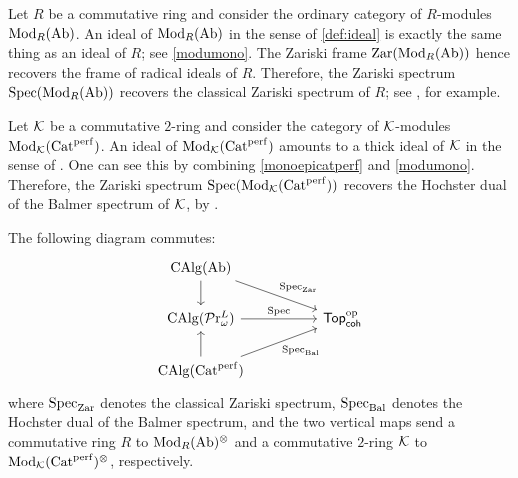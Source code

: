\documentclass[10pt,a4paper,oneside]{article}
\begin{document}
\begin{ex}\label{ex:Zariski}
Let $R$ be a commutative ring and consider the ordinary category of $R$-modules $\operatorname{Mod}_{R}(\operatorname{Ab})$. An ideal of $\operatorname{Mod}_{R}(\operatorname{Ab})$ in the sense of \cref{def:ideal} is exactly the same thing as an ideal of $R$; see \cref{modumono}. The Zariski frame $\operatorname{Zar}(\operatorname{Mod}_{R}(\operatorname{Ab}))$ hence recovers the frame of radical ideals of $R$. Therefore, the Zariski spectrum $\operatorname{Spec}(\operatorname{Mod}_{R}(\operatorname{Ab}))$ recovers the classical Zariski spectrum of $R$; see \cite[Lemma~1.3.1]{KockPitsch17}, for example.
\end{ex}

\begin{ex}\label{ex:Balmer}
Let $\mathcal{K}$ be a commutative $2$-ring and consider the category of $\mathcal K$-modules $\operatorname{Mod}_{\mathcal K}(\operatorname{Cat}^{\operatorname{perf}})$. An ideal of $\operatorname{Mod}_{\mathcal K}(\operatorname{Cat}^{\operatorname{perf}})$ amounts to a thick ideal of $\mathcal K$ in the sense of \cite{Balmer05a}. One can see this by combining \cref{monoepicatperf} and \cref{modumono}. Therefore, the Zariski spectrum $\operatorname{Spec}(\operatorname{Mod}_{\mathcal K}(\operatorname{Cat}^{\operatorname{perf}}))$ recovers the Hochster dual of the Balmer spectrum of $\mathcal K$, by \cite[Corollary~3.4.2]{KockPitsch17}.
\end{ex}


\begin{prop}
The following diagram commutes:
$$	\begin{tikzcd}
\calg(\op{Ab}) \arrow[d] \arrow[rrd, "\spec_{\op{Zar}}"]               &  &                                  \\
\calg(\prl_\omega) \arrow[rr, "\op{Spec}"]                     &  & \topcoh \\
\calg(\op{Cat}^{\op{perf}}) \arrow[u] \arrow[rru, "\spec_{\op{Bal}}"'] &  &                                 
\end{tikzcd}$$
where $\operatorname{Spec}_{\operatorname{Zar}}$ denotes the classical Zariski spectrum, $\operatorname{Spec}_{\operatorname{Bal}}$ denotes the Hochster dual of the Balmer spectrum, and the two vertical maps send a commutative ring $R$ to $\operatorname{Mod}_{R}(\operatorname{Ab})^{\otimes}$ and a commutative $2$-ring $\mathcal K$ to $\operatorname{Mod}_{\mathcal K}(\operatorname{Cat}^{\operatorname{perf}})^{\otimes}$, respectively.
\end{prop}
\end{document}

